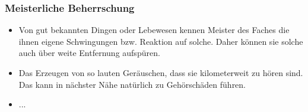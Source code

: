 \subsubsection{Meisterliche Beherrschung} 
\begin{itemize}
	\item Von gut bekannten Dingen oder Lebewesen kennen Meister des Faches die ihnen eigene Schwingungen bzw. Reaktion auf solche. Daher können sie solche auch über weite Entfernung aufspüren.
	\item Das Erzeugen von so lauten Geräuschen, dass sie kilometerweit zu hören sind. Das kann in nächster Nähe natürlich zu Gehörschäden führen.
	\item ...
\end{itemize}
